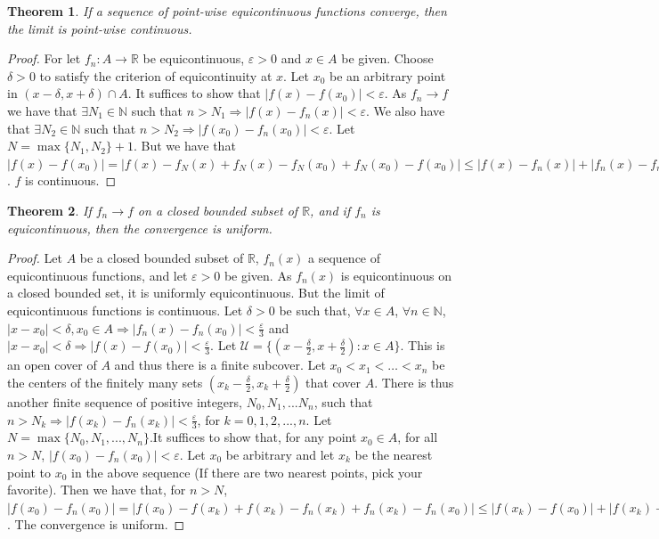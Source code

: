 \documentclass[12pt,oneside]{book}
\theoremstyle{mystyle}
\newtheorem{theorem}{Theorem}[section]
\begin{document}
\begin{theorem} If a sequence of point-wise equicontinuous functions converge, then the limit is point-wise continuous.
\end{theorem}
\begin{proof}
For let $f_n:A\rightarrow \mathbb{R}$ be equicontinuous, $\varepsilon>0$ and $x\in A$ be given. Choose $\delta>0$ to satisfy the criterion of equicontinuity at $x$. Let $x_0$ be an arbitrary point in $(x-\delta,x+\delta)\cap A$. It suffices to show that $|f(x) - f(x_0)|<\varepsilon$. As $f_n \rightarrow f$ we have that $\exists N_1 \in\mathbb{N}$ such that $n>N_1\Rightarrow |f(x) - f_n(x)|<\varepsilon$. We also have that $\exists N_2 \in \mathbb{N}$ such that $n>N_2 \Rightarrow |f(x_0)-f_n(x_0)|<\varepsilon$. Let $N=\max\{N_1,N_2\}+1$. But we have that $|f(x) - f(x_0)| = |f(x) - f_N(x) + f_N(x)-f_N(x_0) + f_N(x_0) - f(x_0)|\leq |f(x) - f_n(x)| + |f_n(x)-f_n(x_0)| + |f_n(x_0) - f(x_0)| < 3\varepsilon$. $f$ is continuous.
\end{proof}

\begin{theorem}
If $f_n \rightarrow f$ on a closed bounded subset of $\mathbb{R}$, and if $f_n$ is equicontinuous, then the convergence is uniform.
\end{theorem}
\begin{proof}
Let $A$ be a closed bounded subset of $\mathbb{R}$, $f_n(x)$ a sequence of equicontinuous functions, and let $\varepsilon>0$ be given. As $f_n(x)$ is equicontinuous on a closed bounded set, it is uniformly equicontinuous. But the limit of equicontinuous functions is continuous. Let $\delta>0$ be such that, $\forall x\in A$, $\forall n\in\mathbb{N}$, $|x-x_0|<\delta, x_0\in A \Rightarrow |f_n(x)-f_n(x_0)|<\frac{\varepsilon}{3}$ and $|x-x_0|<\delta \Rightarrow |f(x)-f(x_0)|<\frac{\varepsilon}{3}$. Let $\mathcal{U} = \{(x-\frac{\delta}{2},x+\frac{\delta}{2}): x\in A\}$. This is an open cover of $A$ and thus there is a finite subcover. Let $x_0<x_1<\hdots<x_n$ be the centers of the finitely many sets $(x_k-\frac{\delta}{2},x_k+\frac{\delta}{2})$ that cover $A$. There is thus another finite sequence of positive integers, $N_0, N_1,... N_n$, such that $n>N_k \Rightarrow |f(x_k)-f_n(x_k)|<\frac{\varepsilon}{3}$, for $k=0,1,2,...,n$. Let $N= \max\{N_0, N_1, ..., N_n\}$.It suffices to show that, for any point $x_0 \in A$, for all $n>N$, $|f(x_0)-f_n(x_0)|<\varepsilon$. Let $x_0$ be arbitrary and let $x_k$ be the nearest point to $x_0$ in the above sequence (If there are two nearest points, pick your favorite). Then we have that, for $n>N$, $|f(x_0) - f_n(x_0)| = |f(x_0)-f(x_k)+f(x_k)-f_n(x_k)+f_n(x_k)-f_n(x_0)|\leq |f(x_k)-f(x_0)|+|f(x_k)-f_n(x_k)|+|f_n(x_k)-f_n(x_0)|<\varepsilon$. The convergence is uniform.
\end{proof}
\end{document}
